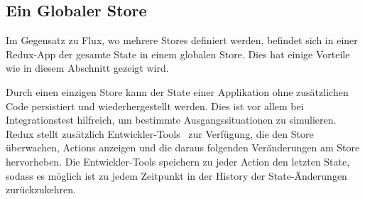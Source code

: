 \subsection{Ein Globaler Store}
\label{ssec:gr_ein_globaler_store}

Im Gegensatz zu Flux, wo mehrere Stores definiert werden, befindet sich in einer
Redux-App der gesamte State in einem globalen Store.  Dies hat einige Vorteile
wie in diesem Abschnitt gezeigt wird.

Durch einen einzigen Store kann der State einer Applikation ohne zusätzlichen
Code persistiert und wiederhergestellt werden.  Dies ist vor allem bei
Integrationstest hilfreich, um bestimmte Ausgangssituationen zu simulieren.
Redux stellt zusätzlich Entwickler-Tools~\cite{reduxDevTools} zur Verfügung, die
den Store überwachen, Actions anzeigen und die daraus folgenden Veränderungen
am Store hervorheben.  Die Entwickler-Tools speichern zu jeder Action den
letzten State, sodass es möglich ist zu jedem Zeitpunkt in der History der
State-Änderungen zurückzukehren.
